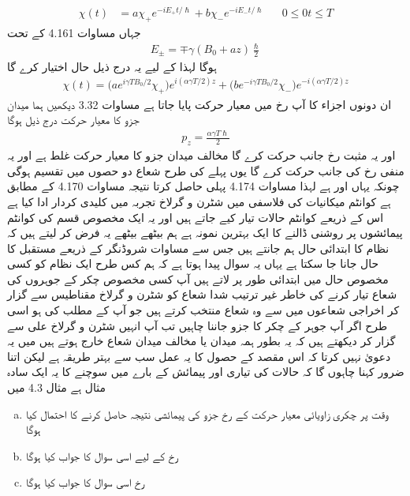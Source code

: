 \begin{align*}
\chi (t) &= a \chi_{+} e^{- i E_{+} t/\hslash} + b \chi_{-} e^{- i E_{-} t/\hslash} && 0 \le 0 t \le T
\end{align*}
جہاں مساوات 4.161 کے تحت 
\begin{align}
E_{\pm} = \mp \gamma (B_0 + a z) \frac{\hslash}{2}
\end{align} 
ہوگا لہذا  کے لیے یہ درج ذیل حال اختیار کرے گا 
\begin{align}
\chi (t) = \big ( a e^{i \gamma T B_0 /2} \chi_{+} \big ) e^{i (\alpha \gamma T/2) z} + \big ( b e^{- i \gamma T B_0 /2} \chi_{-} \big ) e^{- i (\alpha \gamma T/2) z}
\end{align}
ان دونوں اجزاء کا آپ  رخ میں 
معیار حرکت پایا جاتا ہے مساوات 3.32 دیکھیں ہما میدان جزو کا معیار حرکت درج ذیل ہوگا 
\begin{align}
p_z = \frac{\alpha \gamma T \hslash}{2}
\end{align}
اور یہ مثبت  رخ جانب حرکت  کرے گا مخالف میدان جزو کا معیار حرکت غلط ہے اور یہ منفی  رخ کی جانب حرکت کرے گا یوں پہلے کی طرح شعاع دو حصوں میں تقسیم ہوگی چونکہ یہاں  اور  ہے لہذا مساوات 4.174 پہلی حاصل کرتا نتیجہ مساوات 4.170 کے مطابق ہے کوانٹم میکانیات کی فلاسفی میں شٹرن و گرلاخ تجربہ میں کلیدی کردار ادا کیا ہے اس کے ذریعے کوانٹم حالات تیار کیے جاتے ہیں اور یہ ایک مخصوص قسم کی کوانٹم پیمائشوں پر روشنی ڈالنے کا ایک بہترین نمونہ ہے ہم بیٹھے بیٹھے یہ فرض کر لیتے ہیں کہ نظام کا ابتدائی حال ہم جانتے ہیں جس سے مساوات شروڈنگر کے ذریعے مستقبل کا حال جانا جا سکتا ہے یہاں یہ سوال پیدا ہوتا ہے کہ ہم کس طرح ایک نظام کو کسی مخصوص حال میں ابتدائی طور پر لاتے ہیں آپ کسی مخصوص چکر کے جوہروں کی شعاع تیار کرنے کی خاطر غیر ترتیب شدا شعاع کو شٹرن و گرلاخ مقناطیس سے گزار کر اخراجی شعاعوں میں سے وہ شعاع منتخب کرتے ہیں جو آپ کے مطلب کی ہو اسی طرح اگر آپ جوہر کے چکر کا  جزو جاننا چاہیں تب آپ انہیں شٹرن و گرلاخ علی سے گزار کر دیکھتے ہیں کہ یہ بطور ہمہ میدان یا مخالف میدان شعاع خارج ہوتے ہیں میں یہ دعویٰ  نہیں کرتا کہ اس مقصد کے حصول کا یہ عمل سب سے بہتر طریقہ ہے لیکن اتنا ضرور کہنا چاہوں گا کہ حالات کی تیاری اور پیمائش کے بارے میں سوچنے کا یہ ایک سادہ مثال ہے 
مثال 4.3 میں 
\begin{enumerate}[a.]
\item
وقت  پر چکری زاویائی معیار حرکت کے  رخ جزو کی پیمائشی نتیجہ  حاصل کرنے کا احتمال کیا ہوگا 
\item
{} رخ کے لیے اسی سوال کا جواب کیا ہوگا 
\item 
{} رخ اسی سوال کا جواب کیا ہوگا 
\end{enumerate}
